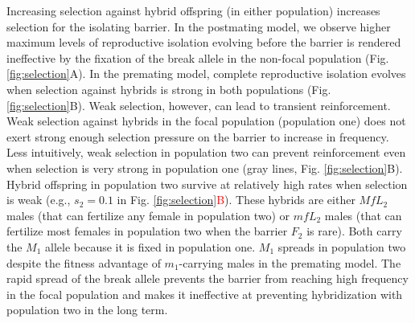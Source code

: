 \documentclass[11pt]{article}
\begin{document}
Increasing selection against hybrid offspring (in either population) increases selection for the isolating barrier. In the postmating model, we observe higher maximum levels of reproductive isolation evolving before the barrier is rendered ineffective by the fixation of the break allele in the non-focal population (Fig. \ref{fig:selection}A).  In the premating model, complete reproductive isolation evolves when selection against hybrids is strong in both populations (Fig. \ref{fig:selection}B).  Weak selection, however, can lead to transient reinforcement.  Weak selection against hybrids in the focal population (population one) does not exert strong enough selection pressure on the barrier to increase in frequency.  Less intuitively, weak selection in population two can prevent reinforcement even when selection is very strong in population one (gray lines, Fig. \ref{fig:selection}B).  Hybrid offspring in population two survive at relatively high rates when selection is weak (e.g., $s_2 = 0.1$ in Fig. \ref{fig:selection}\textcolor{red}{B}). These hybrids are either $MfL_2$ males (that can fertilize any female in population two) or $mfL_2$ males (that can fertilize most females in population two when the barrier $F_2$ is rare).  Both carry the $M_1$ allele because it is fixed in population one. $M_1$ spreads in population two despite the fitness advantage of $m_1$-carrying males in the premating model.  The rapid spread of the break allele prevents the barrier from reaching high frequency in the focal population and makes it ineffective at preventing hybridization with population two in the long term.   
\end{document}
